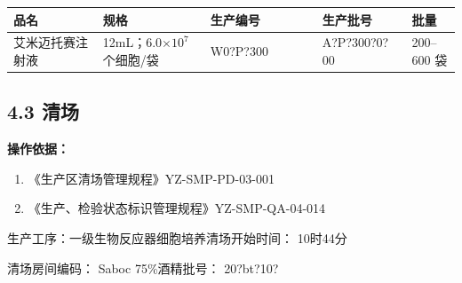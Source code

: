 \documentclass[UTF8,10pt,a4paper,fontset=fandol]{ctexart}
\newcommand{\fieldvalue}[1]{#1}
\newcommand{\handwritten}[1]{#1}
\begin{document}
\begin{tabular}{|p{0.20\linewidth}|p{0.24\linewidth}|p{0.25\linewidth}|p{0.20\linewidth}|p{0.12\linewidth}|}
\hline
品名 & 规格 & 生产编号 & 生产批号 & 批量 \\
\hline
艾米迈托赛注射液 &
12mL；6.0$\times 10^7$个细胞/袋 &
\fieldvalue{\handwritten{W0?P?300}} &
\fieldvalue{\handwritten{A?P?300?0?00}} &
200--600 袋 \\
\hline
\end{tabular}

\subsection*{4.3 清场}

\textbf{操作依据：}

\begin{enumerate}
\item 《生产区清场管理规程》\hfill YZ-SMP-PD-03-001
\item 《生产、检验状态标识管理规程》\hfill YZ-SMP-QA-04-014
\end{enumerate}

生产工序：一级生物反应器细胞培养\hfill 清场开始时间：
\fieldvalue{\handwritten{10时44分}}

清场房间编码：
\fieldvalue{\handwritten{Saboc}}
\hfill 75\%酒精批号：
\fieldvalue{\handwritten{20?bt?10?}}
\end{document}

